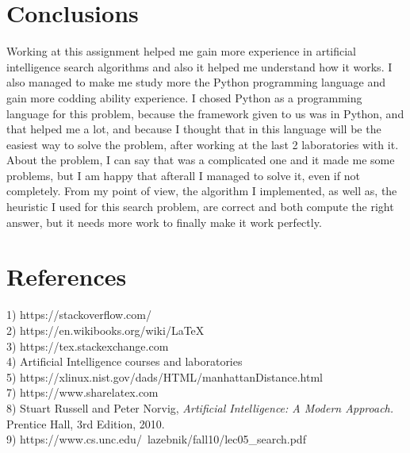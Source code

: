 \documentclass[14pt]{article}
\begin{document}
\section{Conclusions}
Working at this assignment helped me gain more experience in artificial intelligence search algorithms and also it helped me understand how it works. I also managed to make me study more the Python programming language and gain more codding ability experience. I chosed Python as a programming language for this problem, because the framework given to us was in Python, and that helped me a lot, and because I thought that in this language will be the easiest way to solve the problem, after working at the last 2 laboratories with it.
\vspace{2.5 mm}
\\About the problem, I can say that was a complicated one and it made me some problems, but I am happy that afterall I managed to solve it, even if not completely. From my point of view, the algorithm I implemented, as well as, the heuristic I used for this search problem, are correct and both compute the right answer, but it needs more work to finally make it work perfectly.
\newpage
\section{References}
1) https://stackoverflow.com/
\vspace{2.5 mm}
\\2) https://en.wikibooks.org/wiki/LaTeX
\vspace{2.5 mm}
\\3) https://tex.stackexchange.com
\vspace{2.5 mm}
\\4) Artificial Intelligence courses and laboratories
\vspace{2.5 mm}
\\5) https://xlinux.nist.gov/dads/HTML/manhattanDistance.html
\vspace{2.5 mm}
\\7) https://www.sharelatex.com
\vspace{2.5 mm}
\\8) Stuart Russell and Peter Norvig, \textit{Artificial Intelligence: A Modern Approach.} Prentice Hall, 3rd Edition, 2010.
\vspace{2.5 mm}
\\9) https://www.cs.unc.edu/~lazebnik/fall10/lec05\_search.pdf
\end{document}
